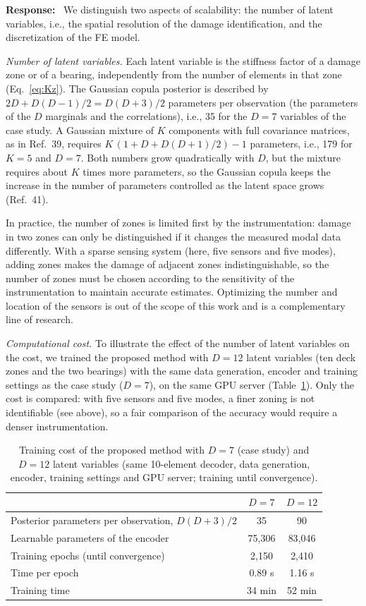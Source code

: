 \documentclass[11pt]{article}
\newenvironment{response}{\par\smallskip\noindent\color{resp}\textbf{Response:}\ }{\par}
\begin{document}
\begin{response}
We distinguish two aspects of scalability: the number of latent variables, i.e., the spatial resolution of the damage
identification, and the discretization of the FE model.

\textit{Number of latent variables.} Each latent variable is the stiffness factor of a damage zone or of a bearing, independently from the number of elements in that zone (Eq.~\eqref{eq:Kz}). 
The Gaussian copula posterior is described by $2D+D(D-1)/2=D(D+3)/2$ parameters per observation (the parameters of
the $D$ marginals and the correlations), i.e., 35 for the $D=7$ variables of the case study. A Gaussian mixture of $K$
components with full covariance matrices, as in Ref.~39, requires $K\,(1+D+D(D+1)/2)-1$ parameters, i.e., 179 for
$K=5$ and $D=7$. Both numbers grow quadratically with $D$, but the mixture requires about $K$ times more parameters, so
the Gaussian copula keeps the increase in the number of parameters controlled as the latent space grows (Ref.~41).

In practice, the number of zones is limited first by
the instrumentation: damage in two zones can only be distinguished if it changes the measured modal data differently.
With a sparse sensing system (here, five sensors and five modes), adding zones makes the damage of adjacent zones
indistinguishable, so the number of zones must be chosen according to the sensitivity of the instrumentation to
maintain accurate estimates. Optimizing the number and location of the sensors is out of the scope of this work and is
a complementary line of research.

\textit{Computational cost.} To illustrate the effect of the number of latent variables on the cost, we trained the
proposed method with $D=12$ latent variables (ten deck zones and the two bearings) with the same data generation,
encoder and training settings as the case study ($D=7$), on the same GPU server (Table~\ref{tab:scal}). Only the cost is
compared: with five sensors and five modes, a finer zoning is not identifiable (see above), so a fair comparison of the
accuracy would require a denser instrumentation.

\begin{table}[H]
\centering\small
\caption{Training cost of the proposed method with $D=7$ (case study) and $D=12$ latent variables (same 10-element
decoder, data generation, encoder, training settings and GPU server; training until convergence).}
\label{tab:scal}
\begin{tabular}{lcc}
\toprule
 & $D=7$ & $D=12$ \\
\midrule
Posterior parameters per observation, $D(D+3)/2$ & 35 & 90 \\
Learnable parameters of the encoder & 75,306 & 83,046 \\
Training epochs (until convergence) & 2,150 & 2,410 \\
Time per epoch & 0.89 s & 1.16 s \\
Training time & 34 min & 52 min \\
\bottomrule
\end{tabular}
\end{table}


\end{response}
\end{document}
